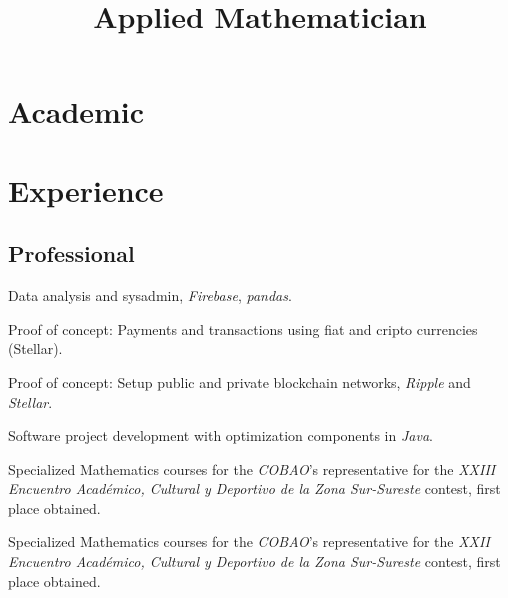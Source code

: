 \documentclass[11pt,letter]{moderncv}
\title{Applied \mbox{Mathematician}}
\begin{document}
\maketitle

\section{Academic}
\label{sec:formacion-academica}


\section{Experience}
\label{sec:experiencia}
\subsection{Professional}
\label{sec:profesional}


 {Data analysis and sysadmin, \emph{Firebase}, \emph{pandas}.}

 {Proof of concept: Payments and transactions using fiat and cripto currencies (Stellar).}


 {Proof of concept: Setup public and private blockchain networks, \emph{Ripple} and \emph{Stellar}.}


 {Software project development with optimization components in {\em Java}.}

 {Specialized Mathematics
  courses for the {\em COBAO}'s representative for the {\em XXIII
    Encuentro Académico, Cultural y Deportivo de la Zona Sur-Sureste}
  contest, first place obtained.}

 {Specialized Mathematics
  courses for the {\em COBAO}'s representative for the {\em XXII
    Encuentro Académico, Cultural y Deportivo de la Zona Sur-Sureste}
  contest, first place obtained.}
\end{document}
